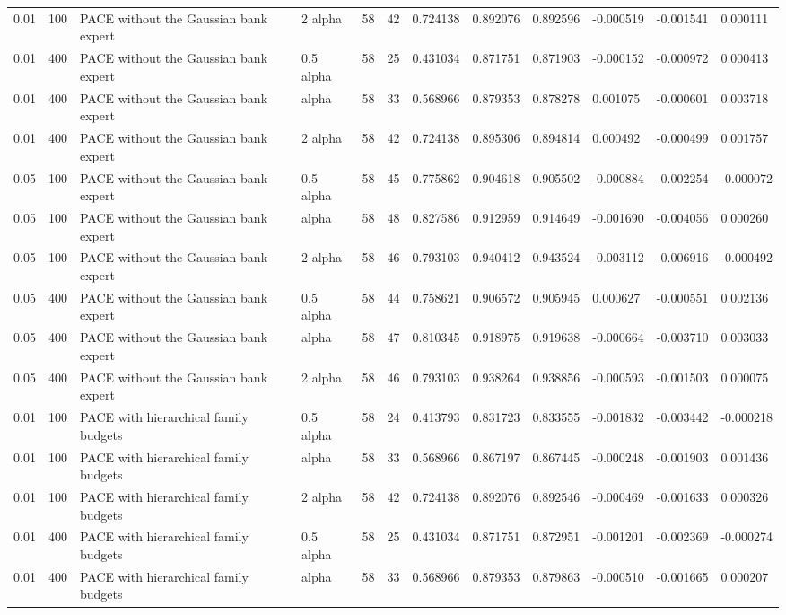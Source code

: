 \begin{tabular}{llllllllllll}
0.01 & 100 & PACE without the Gaussian bank expert & 2 alpha & 58 & 42 & 0.724138 & 0.892076 & 0.892596 & -0.000519 & -0.001541 & 0.000111 \\
0.01 & 400 & PACE without the Gaussian bank expert & 0.5 alpha & 58 & 25 & 0.431034 & 0.871751 & 0.871903 & -0.000152 & -0.000972 & 0.000413 \\
0.01 & 400 & PACE without the Gaussian bank expert & alpha & 58 & 33 & 0.568966 & 0.879353 & 0.878278 & 0.001075 & -0.000601 & 0.003718 \\
0.01 & 400 & PACE without the Gaussian bank expert & 2 alpha & 58 & 42 & 0.724138 & 0.895306 & 0.894814 & 0.000492 & -0.000499 & 0.001757 \\
0.05 & 100 & PACE without the Gaussian bank expert & 0.5 alpha & 58 & 45 & 0.775862 & 0.904618 & 0.905502 & -0.000884 & -0.002254 & -0.000072 \\
0.05 & 100 & PACE without the Gaussian bank expert & alpha & 58 & 48 & 0.827586 & 0.912959 & 0.914649 & -0.001690 & -0.004056 & 0.000260 \\
0.05 & 100 & PACE without the Gaussian bank expert & 2 alpha & 58 & 46 & 0.793103 & 0.940412 & 0.943524 & -0.003112 & -0.006916 & -0.000492 \\
0.05 & 400 & PACE without the Gaussian bank expert & 0.5 alpha & 58 & 44 & 0.758621 & 0.906572 & 0.905945 & 0.000627 & -0.000551 & 0.002136 \\
0.05 & 400 & PACE without the Gaussian bank expert & alpha & 58 & 47 & 0.810345 & 0.918975 & 0.919638 & -0.000664 & -0.003710 & 0.003033 \\
0.05 & 400 & PACE without the Gaussian bank expert & 2 alpha & 58 & 46 & 0.793103 & 0.938264 & 0.938856 & -0.000593 & -0.001503 & 0.000075 \\
0.01 & 100 & PACE with hierarchical family budgets & 0.5 alpha & 58 & 24 & 0.413793 & 0.831723 & 0.833555 & -0.001832 & -0.003442 & -0.000218 \\
0.01 & 100 & PACE with hierarchical family budgets & alpha & 58 & 33 & 0.568966 & 0.867197 & 0.867445 & -0.000248 & -0.001903 & 0.001436 \\
0.01 & 100 & PACE with hierarchical family budgets & 2 alpha & 58 & 42 & 0.724138 & 0.892076 & 0.892546 & -0.000469 & -0.001633 & 0.000326 \\
0.01 & 400 & PACE with hierarchical family budgets & 0.5 alpha & 58 & 25 & 0.431034 & 0.871751 & 0.872951 & -0.001201 & -0.002369 & -0.000274 \\
0.01 & 400 & PACE with hierarchical family budgets & alpha & 58 & 33 & 0.568966 & 0.879353 & 0.879863 & -0.000510 & -0.001665 & 0.000207 \\

\end{tabular}
